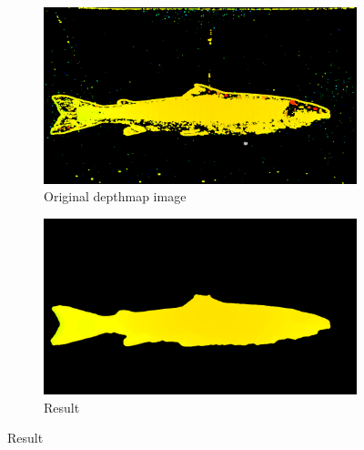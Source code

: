 \begin{figure}[H]
    \medskip
    \begin{subfigure}{0.49\textwidth}
        \includegraphics[width=\linewidth]{images/results/algorithm_test/original_82}
        \caption{Original depthmap image} 
        \label{fig:original_depthmap_82}
    \end{subfigure}\hspace*{\fill}
    \begin{subfigure}{0.49\textwidth}
        \includegraphics[width=\linewidth]{images/results/algorithm_test/median_filter_63}
        \caption{Result} 
        \label{fig:result_82}
    \end{subfigure}
    

\end{figure}
